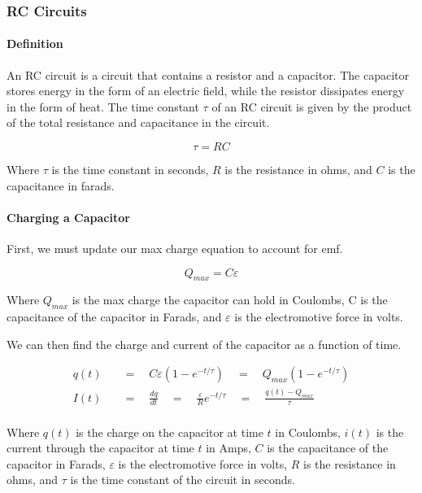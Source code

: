\hrulefill

\subsubsection*{RC Circuits}

\paragraph*{Definition}
An RC circuit is a circuit that contains a resistor and a capacitor. The capacitor stores energy in the form of an electric field, 
while the resistor dissipates energy in the form of heat. The time constant $\tau$ of an RC circuit is given by the product of the 
total resistance and capacitance in the circuit.

\begin{equation*}
    \tau = RC
\end{equation*}

Where $\tau$ is the time constant in seconds, $R$ is the resistance in ohms, and $C$ is the capacitance in farads. 

\paragraph*{Charging a Capacitor}
First, we must update our max charge equation to account for emf.

\begin{equation*}
    Q_{max} = C\varepsilon
\end{equation*}

Where $Q_{max}$ is the max charge the capacitor can hold in Coulombs, C is the capacitance of the capacitor in Farads, and $\varepsilon$
is the electromotive force in volts.\\

\pagebreak

We can then find the charge and current of the capacitor as a function of time.

\begin{align*}
    q(t) \quad &= \quad C\varepsilon(1-e^{-t/\tau}) \quad = \quad Q_{max}(1-e^{-t/\tau})\\
    I(t) \quad &= \quad \frac{dq}{dt} \quad = \quad \frac{\varepsilon}{R}e^{-t/\tau} \quad = \quad \frac{q(t) - Q_{max}}{\tau}\\
\end{align*}

Where $q(t)$ is the charge on the capacitor at time $t$ in Coulombs, $i(t)$ is the current through the capacitor at time $t$ in Amps,
$C$ is the capacitance of the capacitor in Farads, $\varepsilon$ is the electromotive force in volts, $R$ is the resistance in ohms,
and $\tau$ is the time constant of the circuit in seconds.


